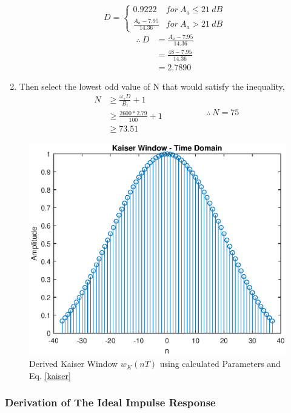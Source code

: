 \documentclass[a4paper,11pt]{article}%
\begin{document}
\begin{enumerate}[\hspace{1cm}a.)]
\[
D = \begin{cases}
	0.9222 & for ~ A_a \leq 21 ~dB \\

	\frac{A_a - 7.95}{14.36} & for ~ A_a > 21 ~dB
\end{cases}
\]\hspace{2cm}
\[
\begin{split}
	\therefore~ D &= \frac{A_a - 7.95}{14.36}\\
	&=\frac{48 - 7.95}{14.36}\\
	&=  2.7890
\end{split}
\]

\item Then select the lowest odd value of N that would satisfy the inequality,
\[
\begin{split}
	N  & \geq \frac{\omega_sD}{B_t}+1\\
	&\geq \frac{2600*2.79}{100}+1\\
	&\geq 73.51
\end{split}
\hspace{2cm}
\therefore~	N = 75
\]
\end{enumerate}

\begin{figure}[!h]
	\centering
	\includegraphics[scale=0.4]{figures/kaisertime}
	\caption{Derived Kaiser Window $w_K(nT)$ using calculated Parameters and Eq. \eqref{kaiser}}
\end{figure}

\subsubsection{Derivation of The Ideal Impulse Response}
\end{document}
